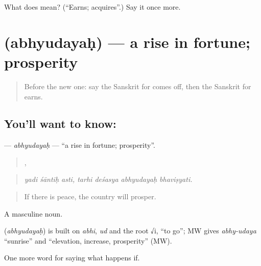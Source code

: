 \begin{tcolorbox}[breakable,colback=teal!4,colframe=teal!35!black,title={Before you move on}]
What does  mean? (\textquotedblleft{}Earns; acquires\textquotedblright{}.) Say it once more.
\end{tcolorbox}
\section[\texorpdfstring{\sk{अभ्युदयः} (abhyudayaḥ)}{अभ्युदयः (abhyudayaḥ)}]{ (abhyudayaḥ) — a rise in fortune; prosperity}

\label{lesson:SA-C386-abhyudayah}



\begin{quote}
Before the new one: say the Sanskrit for comes off, then the Sanskrit for earns.
\end{quote}

\subsection*{You'll want to know: }
\textbf{} — \emph{abhyudayaḥ} — \textquotedblleft{}a rise in fortune; prosperity\textquotedblright{}.

\begin{quote}
  ,    
\end{quote}

\begin{quote}
\emph{yadi śāntiḥ asti, tarhi deśasya abhyudayaḥ bhaviṣyati.}
\end{quote}

\begin{quote}
If there is peace, the country will prosper.
\end{quote}

A masculine noun.

\begin{cousinweb}
\textbf{} (\emph{abhyudayaḥ}) is built on \emph{abhi}, \emph{ud} and the root √i, \textquotedblleft{}to go\textquotedblright{}; MW gives \emph{abhy-udaya} \textquotedblleft{}sunrise\textquotedblright{} and \textquotedblleft{}elevation, increase, prosperity\textquotedblright{} (MW).
\end{cousinweb}

\begin{grammarlens}[title={What you've built}]
One more word for saying what happens if.
\end{grammarlens}

